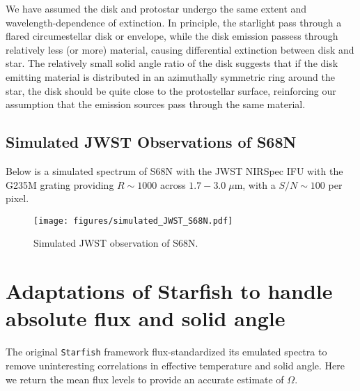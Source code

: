 \documentclass[twocolumn]{emulateapj}%
\begin{document}
We have assumed the disk and protostar undergo the same extent and wavelength-dependence of extinction.  In principle, the starlight pass through a flared circumestellar disk or envelope, while the disk emission passess through relatively less (or more) material, causing differential extinction between disk and star.  The relatively small solid angle ratio of the disk suggests that if the disk emitting material is distributed in an azimuthally symmetric ring around the star, the disk should be quite close to the protostellar surface, reinforcing our assumption that the emission sources pass through the same material.


\subsection{Simulated JWST Observations of S68N}

Below is a simulated spectrum of S68N with the JWST NIRSpec IFU with the G235M grating providing $R\sim1000$ across $1.7-3.0 \; \mu$m, with a $S/N \sim 100$ per pixel.  

\begin{figure}
 \centering
 \texttt{[image: figures/simulated\_JWST\_S68N.pdf]}
 \caption{Simulated JWST observation of S68N.}
 \label{fig:JWST}
\end{figure}


\clearpage
\pagebreak


\appendix

\section{Adaptations of Starfish to handle absolute flux and solid angle}
The original \texttt{Starfish} framework flux-standardized its emulated spectra to remove uninteresting correlations in effective temperature and solid angle.  Here we return the mean flux levels to provide an accurate estimate of $\Omega$.
\end{document}
